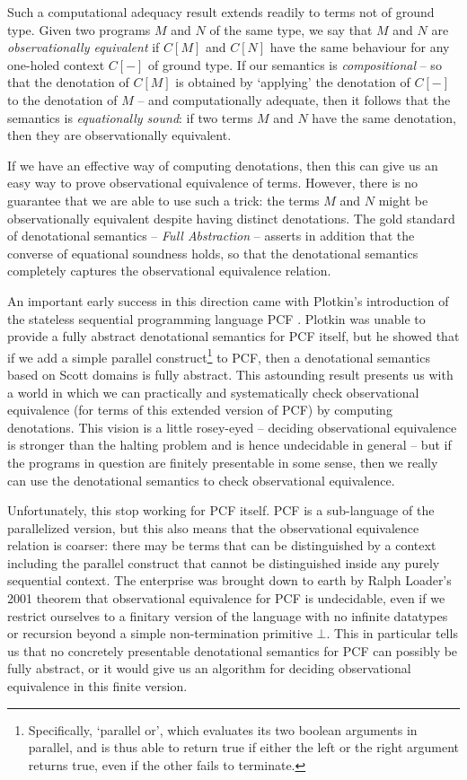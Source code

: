 \documentclass[11pt]{report}
\begin{document}
Such a computational adequacy result extends readily to terms not of ground type.  
Given two programs $M$ and $N$ of the same type, we say that $M$ and $N$ are \emph{observationally equivalent} if $C[M]$ and $C[N]$ have the same behaviour for any one-holed context $C[-]$ of ground type.
If our semantics is \emph{compositional} -- so that the denotation of $C[M]$ is obtained by `applying' the denotation of $C[-]$ to the denotation of $M$ -- and computationally adequate, then it follows that the semantics is \emph{equationally sound}: if two terms $M$ and $N$ have the same denotation, then they are observationally equivalent.

If we have an effective way of computing denotations, then this can give us an easy way to prove observational equivalence of terms.  
However, there is no guarantee that we are able to use such a trick: the terms $M$ and $N$ might be observationally equivalent despite having distinct denotations.  
The gold standard of denotational semantics -- \emph{Full Abstraction} -- asserts in addition that the converse of equational soundness holds, so that the denotational semantics completely captures the observational equivalence relation.  

An important early success in this direction came with Plotkin's introduction of the stateless sequential programming language PCF \cite{PlotkinPcf}.  
Plotkin was unable to provide a fully abstract denotational semantics for PCF itself, but he showed that if we add a simple parallel construct\footnote{Specifically, `parallel or', which evaluates its two boolean arguments in parallel, and is thus able to return true if either the left or the right argument returns true, even if the other fails to terminate.} to PCF, then a denotational semantics based on Scott domains is fully abstract.  
This astounding result presents us with a world in which we can practically and systematically check observational equivalence (for terms of this extended version of PCF) by computing denotations.  
This vision is a little rosey-eyed -- deciding observational equivalence is stronger than the halting problem and is hence undecidable in general -- but if the programs in question are finitely presentable in some sense, then we really can use the denotational semantics to check observational equivalence.

Unfortunately, this stop working for PCF itself.  
PCF is a sub-language of the parallelized version, but this also means that the observational equivalence relation is coarser: there may be terms that can be distinguished by a context including the parallel construct that cannot be distinguished inside any purely sequential context.  
The enterprise was brought down to earth by Ralph Loader's 2001 theorem that observational equivalence for PCF is undecidable, even if we restrict ourselves to a finitary version of the language with no infinite datatypes or recursion beyond a simple non-termination primitive $\bot$.
This in particular tells us that no concretely presentable denotational semantics for PCF can possibly be fully abstract, or it would give us an algorithm for deciding observational equivalence in this finite version.
\end{document}
